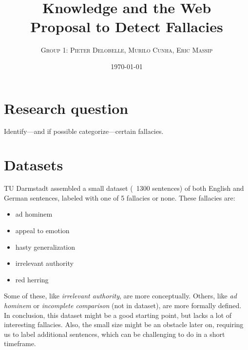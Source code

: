 \documentclass[a4paper]{article}
\begin{document}
\title{Knowledge and the Web \\ 
\large{Proposal to Detect Fallacies}}
\author{\textsc{Group 1: Pieter Delobelle, Murilo Cunha, Eric Massip}}
\date{\today}
\maketitle

\section{Research question}
Identify---and if possible categorize---certain fallacies.

\section{Datasets}
TU Darmstadt assembled a small dataset (~1300 sentences) of both English and German sentences, labeled with one of 5 fallacies or none. These fallacies are:

\begin{itemize}
    \item ad hominem
    \item appeal to emotion
    \item hasty generalization
    \item irrelevant authority
    \item red herring
\end{itemize}

Some of these, like \emph{irrelevant authority}, are more conceptually. Others, like \emph{ad hominem} or \emph{incomplete comparison} (not in dataset), are more formally defined. In conclusion, this dataset might be a good starting point, but lacks a lot of interesting fallacies. Also, the small size might be an obstacle later on, requiring us to label additional sentences, which can be challenging to do in a short timeframe. 
\end{document}
